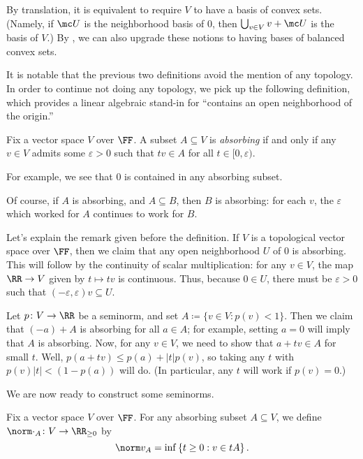 \documentclass[notes.tex]{subfiles}
\begin{document}
\begin{remark} \label{rem:better-locally-convex}
	By translation, it is equivalent to require $V$ to have a basis of convex sets. (Namely, if $\mc U$ is the neighborhood basis of $0$, then $\bigcup_{v\in V}v+\mc U$ is the basis of $V$.) By , we can also upgrade these notions to having bases of balanced convex sets.
\end{remark}
It is notable that the previous two definitions avoid the mention of any topology. In order to continue not doing any topology, we pick up the following definition, which provides a linear algebraic stand-in for ``contains an open neighborhood of the origin.''
\begin{definition}[absorbing]
	Fix a vector space $V$ over $\FF$. A subset $A\subseteq V$ is \textit{absorbing} if and only if any $v\in V$ admits some $\varepsilon>0$ such that $tv\in A$ for all $t\in[0,\varepsilon)$.
\end{definition}
For example, we see that $0$ is contained in any absorbing subset.
\begin{remark}
	Of course, if $A$ is absorbing, and $A\subseteq B$, then $B$ is absorbing: for each $v$, the $\varepsilon$ which worked for $A$ continues to work for $B$.
\end{remark}
\begin{example} \label{ex:open-to-absorbing}
	Let's explain the remark given before the definition. If $V$ is a topological vector space over $\FF$, then we claim that any open neighborhood $U$ of $0$ is absorbing. This will follow by the continuity of scalar multiplication: for any $v\in V$, the map $\RR\to V$ given by $t\mapsto tv$ is continuous. Thus, because $0\in U$, there must be $\varepsilon>0$ such that $(-\varepsilon,\varepsilon)v\subseteq U$.
\end{example}
\begin{example} \label{ex:seminorm-to-absorbing}
	Let $p\colon V\to\RR$ be a seminorm, and set $A\coloneqq\{v\in V:p(v)<1\}$. Then we claim that $(-a)+A$ is absorbing for all $a\in A$; for example, setting $a=0$ will imply that $A$ is absorbing. Now, for any $v\in V$, we need to show that $a+tv\in A$ for small $t$. Well, $p(a+tv)\le p(a)+\left|t\right|p(v)$, so taking any $t$ with $p(v)\left|t\right|<(1-p(a))$ will do. (In particular, any $t$ will work if $p(v)=0$.)
\end{example}
We are now ready to construct some seminorms.
\begin{notation}
	Fix a vector space $V$ over $\FF$. For any absorbing subset $A\subseteq V$, we define $\norm\cdot_A\colon V\to\RR_{\ge0}$ by
	\[\norm v_A=\inf\left\{t\ge0:v\in tA\right\}.\]
\end{notation}
\end{document}

